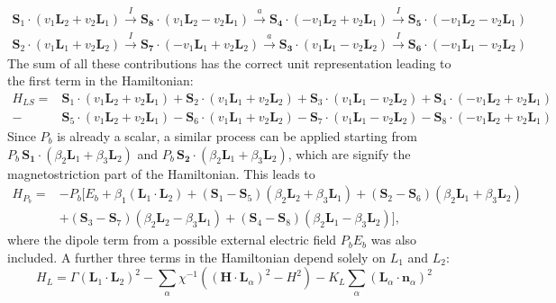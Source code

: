 \begin{align}
	\mathbf{S}_1\cdot(v_1 \mathbf{L}_2 + v_2 \mathbf{L}_1) \xrightarrow{I} \mathbf{S_8}\cdot(v_1 \mathbf{L}_2 - v_2 \mathbf{L}_1) \xrightarrow{a} \mathbf{S_4} \cdot (- v_1 \mathbf{L}_2 + v_2 \mathbf{L}_1) \xrightarrow{I} \mathbf{S_5} \cdot (-v_1 \mathbf{L}_2 - v_2 \mathbf{L}_1) \nonumber\\
	\mathbf{S}_2\cdot(v_1 \mathbf{L}_1 + v_2 \mathbf{L}_2) \xrightarrow{I} \mathbf{S_7}\cdot(-v_1 \mathbf{L}_1 + v_2 \mathbf{L}_2) \xrightarrow{a} \mathbf{S_3} \cdot (v_1 \mathbf{L}_1 - v_2 \mathbf{L}_2) \xrightarrow{I} \mathbf{S_6} \cdot (-v_1 \mathbf{L}_1 - v_2 \mathbf{L}_2) 
\end{align}
The sum of all these contributions has the correct unit representation leading to the first term in the Hamiltonian:
\begin{align}
    H_{LS} =& \mathbf{S}_1 \cdot (v_1 \mathbf{L}_2 + v_2 \mathbf{L}_1) + \mathbf{S}_2 \cdot (v_1 \mathbf{L}_1 + v_2 \mathbf{L}_2) + \mathbf{S}_3 \cdot (v_1 \mathbf{L}_1 - v_2 \mathbf{L}_2) + \mathbf{S}_4 \cdot (-v_1 \mathbf{L}_2 + v_2 \mathbf{L}_1) \nonumber\\
    -&\mathbf{S}_5 \cdot (v_1 \mathbf{L}_2 + v_2 \mathbf{L}_1) - \mathbf{S}_6 \cdot (v_1 \mathbf{L}_1 + v_2 \mathbf{L}_2) - \mathbf{S}_7 \cdot (v_1 \mathbf{L}_1 - v_2 \mathbf{L}_2) - \mathbf{S}_8 \cdot (-v_1 \mathbf{L}_2 + v_2 \mathbf{L}_1)
\end{align}
Since $P_b$ is already a scalar, a similar process can be applied starting from $P_b \, \mathbf{S_1}\cdot(\beta_2 \mathbf{L}_1 + \beta_3 \mathbf{L}_2)$ and $P_b\, \mathbf{S_2}\cdot(\beta_2 \mathbf{L}_1 + \beta_3 \mathbf{L}_2)$, which are signify the magnetostriction part of the Hamiltonian. This leads to
\begin{align}
	H_{P_b}=&-P_b[E_b + \beta_1 (\mathbf{L}_1\cdot \mathbf{L}_2)+
    (\mathbf{S}_1-\mathbf{S}_5)(\beta_2 \mathbf{L}_2 + \beta_3 \mathbf{L}_1) +
    (\mathbf{S}_2-\mathbf{S}_6)(\beta_2 \mathbf{L}_1 + \beta_3 \mathbf{L}_2) \nonumber\\ 
    &+(\mathbf{S}_3-\mathbf{S}_7)(\beta_2 \mathbf{L}_2 - \beta_3 \mathbf{L}_1) +
    (\mathbf{S}_4-\mathbf{S}_8)(\beta_2 \mathbf{L}_1 - \beta_3 \mathbf{L}_2)],
\end{align}
where the dipole term from a possible external electric field $P_b E_b$ was also included. 
A further three terms in the Hamiltonian depend solely on $L_1$ and $L_2$:
\begin{equation}
	H_L = \Gamma(\mathbf{L}_1\cdot \mathbf{L}_2)^2
    -\sum_{\alpha}\chi^{-1}((\mathbf{H}\cdot \mathbf{L}_\alpha)^2-H^2)
    -K_L\sum_\alpha(\mathbf{L}_\alpha\cdot \mathbf{n}_\alpha)^2\label{eq:GdMn2O5_hami_1}
\end{equation}
